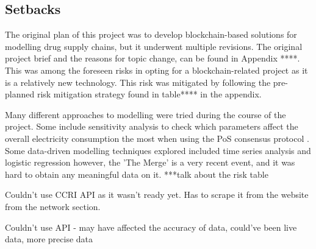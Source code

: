 \subsection{Setbacks}

The original plan of this project was to develop blockchain-based solutions for modelling drug supply chains, but it underwent multiple revisions. The original project brief and the reasons for topic change, can be found in Appendix ****. This was among the foreseen risks in opting for a blockchain-related project as it is a relatively new technology. This risk was mitigated by following the pre-planned risk mitigation strategy found in table**** in the appendix.



Many different approaches to modelling were tried during the course of the project. Some include sensitivity analysis to check which parameters affect the overall electricity consumption the most when using the PoS consensus protocol \cite{MarionAnModelling}. Some data-driven modelling techniques explored included time series analysis and logistic regression \cite{IbanezTheExpansion} however, the 'The Merge' is a very recent event, and it was hard to obtain any meaningful data on it.  ***talk about the risk table

Couldn't use CCRI API as it wasn't ready yet. Has to scrape it from the website from the network section.

Couldn't use API - may have affected the accuracy of data, could've been live data, more precise data


